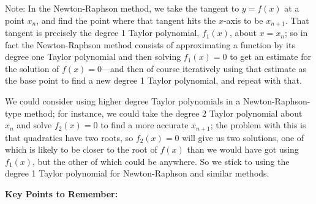 \documentclass{article}
\begin{document}
\vspace{3mm}

Note: In the Newton-Raphson method, we take the tangent to $y=f(x)$ at a point $x_n$, and find the point where that tangent hits the $x$-axis to be $x_{n+1}$. That tangent is precisely the degree 1 Taylor polynomial, $f_1(x)$, about $x=x_n$; so in fact the Newton-Raphson method consists of approximating a function by its degree one Taylor polynomial and then solving $f_1(x)=0$ to get an estimate for the solution of $f(x)=0$---and then of course iteratively using that estimate as the base point to find a new degree 1 Taylor polynomial, and repeat with that.

We could consider using higher degree Taylor polynomials in a Newton-Raphson-type method; for instance, we could take the degree 2 Taylor polynomial about $x_n$ and solve $f_2(x)=0$ to find a more accurate $x_{n+1}$; the problem with this is that quadratics have two roots, so $f_2(x)=0$ will give us two solutions, one of which is likely to be closer to the root of $f(x)$ than we would have got using $f_1(x)$, but the other of which could be anywhere. So we stick to using the degree 1 Taylor polynomial for Newton-Raphson and similar methods.


\clearpage
















{\bf Key Points to Remember:}

\vspace{5mm}
\end{document}
